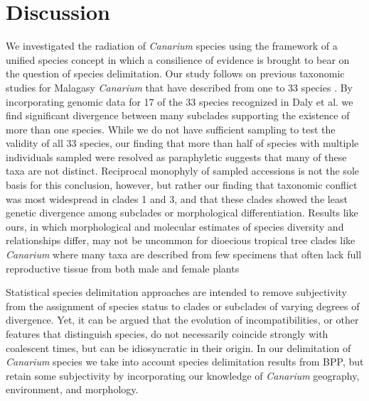 \documentclass[10pt,letterpaper]{article}
\begin{document}
\section*{Discussion}
We investigated the radiation of \emph{Canarium} species using the framework of a unified species concept \cite{de_queiroz_species_2007} in which a consilience of evidence is brought to bear on the question of species delimitation. Our study follows on previous taxonomic studies for Malagasy \emph{Canarium} that have described from one to 33 species \cite{leenhouts_revision_1959,daly_revision_2015}. By incorporating genomic data for 17 of the 33 species recognized in Daly et al. \cite{daly_revision_2015} we find significant divergence between many subclades supporting the existence of more than one species. While we do not have sufficient sampling to test the validity of all 33 species, our finding that more than half of species with multiple individuals sampled were resolved as paraphyletic suggests that many of these taxa are not distinct. Reciprocal monophyly of sampled accessions is not the sole basis for this conclusion, however, but rather our finding that taxonomic conflict was most widespread in clades 1 and 3, and that these clades showed the least genetic divergence among subclades or morphological differentiation. %
Results like ours, in which morphological and molecular estimates of species diversity and relationships differ, may not be uncommon for dioecious tropical tree clades like \emph{Canarium} where many taxa are described from few specimens that often lack full reproductive tissue from both male and female plants

Statistical species delimitation approaches are intended to remove subjectivity from the assignment of species status to clades or subclades of varying degrees of divergence. Yet, it can be argued that the evolution of incompatibilities, or other features that distinguish species, do not necessarily coincide strongly with coalescent times, but can be idiosyncratic in their origin. In our delimitation of \emph{Canarium} species we take into account species delimitation results from BPP, but retain some subjectivity by incorporating our knowledge of \emph{Canarium} geography, environment, and morphology. 
\end{document}
